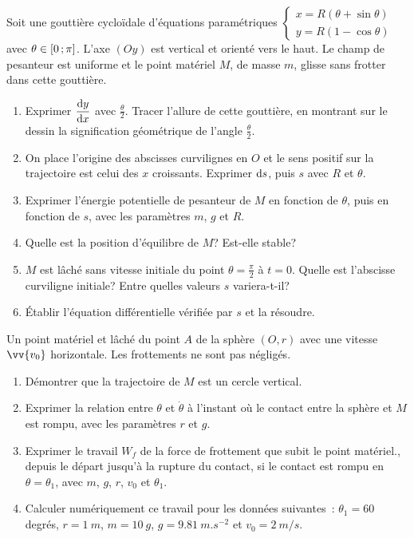 \begin{exercice}%
  Soit une gouttière cycloïdale d'équations paramétriques \(\begin{cases} x = 
  R(\theta +\sin\theta) \\ y=R(1-\cos\theta)\end{cases}\) avec \(\theta \in 
  \left[ 0 \, ;  \pi \right]\). L'axe \((Oy)\) est vertical et orienté vers le haut. 
  Le champ de pesanteur est uniforme et le point matériel \(M\), de masse 
  \(m\), glisse sans frotter dans cette gouttière.
  \begin{enumerate}
  \item Exprimer \(\dfrac{\mathrm{d} y}{\mathrm{d} x}\) avec \(\frac{\theta}{2}\). Tracer l'allure 
    de cette gouttière, en montrant sur le dessin la signification géométrique 
      de l'angle \(\frac{\theta}{2}\).
  \item On place l'origine des abscisses curvilignes en \(O\) et le sens 
    positif sur la trajectoire est celui des \(x\) croissants. Exprimer \(\mathrm{d} 
      s\), puis \(s\) avec \(R\) et \(\theta\).
  \item Exprimer l'énergie potentielle de pesanteur de \(M\) en fonction de 
    \(\theta\), puis en fonction de \(s\), avec les paramètres \(m\), \(g\) et 
      \(R\).
  \item Quelle est la position d'équilibre de \(M\)? Est-elle stable?
  \item \(M\) est lâché sans vitesse initiale du point \(\theta=\frac{\pi}{2}\) 
    à \(t=0\). Quelle est l'abscisse curviligne initiale? Entre quelles 
      valeurs \(s\) variera-t-il?
  \item Établir l'équation différentielle vérifiée par \(s\) et la résoudre.
 \end{enumerate}
\end{exercice}%
%
\begin{exercice}%
  Un point matériel et lâché du point \(A\) de la sphère \((O, r)\) avec une 
  vitesse \(\vv{v_0}\) horizontale. Les frottements ne sont pas négligés.
  \begin{enumerate}
  \item Démontrer que la trajectoire de \(M\) est un cercle vertical.
  \item Exprimer la relation entre \(\theta\) et \(\dot{\theta}\) à l'instant 
    où le contact entre la sphère et \(M\) est rompu, avec les paramètres \(r\) 
      et \(g\).
  \item Exprimer le travail \(W_f\) de la force de frottement que subit le 
    point matériel., depuis le départ jusqu'à la rupture du contact, si le 
      contact est rompu en \(\theta=\theta_1\), avec \(m\), \(g\), \(r\), 
      \(v_0\) et \(\theta_1\).
  \item Calculer numériquement ce travail pour les données suivantes~: 
    \(\theta_1=60\) degrés, \(r=\SI{1}{m}\), \(m=\SI{10}{g}\), 
      \(g=\SI{9,81}{m.s^{-2}}\) et \(v_0=\SI{2}{m/s}\).
  \end{enumerate}
\end{exercice}%
